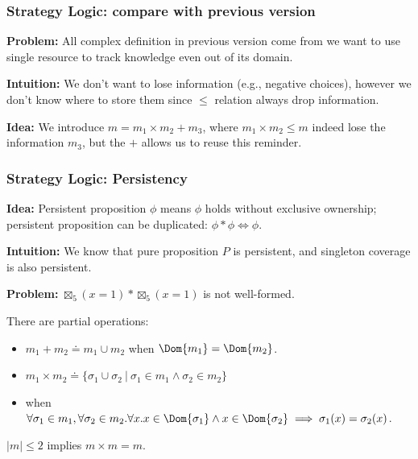 \begin{frame}[fragile]
    \frametitle{Strategy Logic: compare with previous version}

\textbf{Problem:} All complex definition in previous version come from we want to use single resource to track knowledge even out of its domain.

\textbf{Intuition:} We don't want to lose information (e.g., negative choices), however we don't know where to store them since $\leq$ relation always drop information.

\textbf{Idea:} We introduce $m = m_1 \times m_2 + m_3$, where $m_1 \times m_2 \leq m$ indeed lose the information $m_3$, but the $+$ allows us to reuse this reminder.


\end{frame}

\begin{frame}[fragile]
    \frametitle{Strategy Logic: Persistency}

\textbf{Idea:} Persistent proposition $\phi$ means $\phi$ holds without exclusive ownership; persistent proposition can be duplicated: $\phi * \phi \iff \phi$.

\textbf{Intuition:} We know that pure proposition $P$ is persistent, and singleton coverage is also persistent.

\textbf{Problem:} $\boxtimes_5 (x = 1) * \boxtimes_5 (x = 1)$ is not well-formed.

\begin{definition} There are partial operations:
    \begin{itemize}
        \item $m_1 + m_2 \doteq m_1 \cup m_2$ when $\Dom{m_1} = \Dom{m_2}$.
        \item $m_1 \times m_2 \doteq \{ \sigma_1 \cup \sigma_2 ~|~ \sigma_1 \in m_1 \land \sigma_2 \in m_2 \}$
        \item when $\forall \sigma_1 \in m_1, \forall \sigma_2 \in m_2. \forall x. x \in \Dom{\sigma_1} \land x \in \Dom{\sigma_2} \implies \sigma_1(x) = \sigma_2(x)$.
    \end{itemize}
\end{definition}

\begin{lemma}[Idempotency] $|m| \leq 2$ implies $m \times m = m$.
\end{lemma}

\end{frame}

